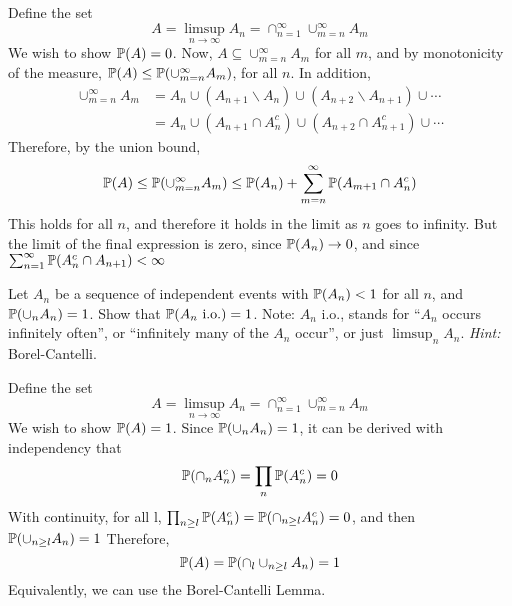 \documentclass[a4paper, 12pt, answers]{exam}
\newcommand{\rai}{\rightarrow \infty}
\begin{document}
\begin{questions}
\begin{solution}
	Define the set
	\begin{equation*}
	A=\limsup_{n\rai}A_n=\cap_{n=1}^{\infty}\cup_{m=n}^{\infty}A_m
	\end{equation*}
	We wish to show $\operatorname{\mathbb{P}}(A)=0$. Now, $A\subseteq \cup_{m=n}^{\infty}A_m$ for all $m$, and by monotonicity of the measure, $\operatorname{\mathbb{P}}(A)\le\operatorname{\mathbb{P}}(\cup_{m=n}^{\infty} A_m)$, for all $n$. In addition,
	\begin{equation*}
	\begin{aligned}
	\cup_{m=n}^{\infty}A_m&=A_n\cup(A_{n+1}\backslash A_n)\cup(A_{n+2}\backslash A_{n+1})\cup\cdots\\
	&=A_n\cup(A_{n+1}\cap A_n^c)\cup(A_{n+2}\cap A_{n+1}^c)\cup\cdots
	\end{aligned}
	\end{equation*}
	Therefore, by the union bound,
	\begin{equation*}
	\operatorname{\mathbb{P}}(A)\le\operatorname{\mathbb{P}}(\cup_{m=n}^{\infty}A_m)\le\operatorname{\mathbb{P}}(A_n)+\sum_{m=n}^{\infty}\operatorname{\mathbb{P}}(A_{m+1}\cap A_n^c)
	\end{equation*}
	This holds for all $n$, and therefore it holds in the limit as $n$ goes to infinity. But the limit of the final expression is zero, since $\operatorname{\mathbb{P}}(A_n)\rightarrow 0$, and since $\sum_{n=1}^{\infty}\operatorname{\mathbb{P}}(A_n^c\cap A_{n+1})<\infty$
\end{solution}
\question Let $A_n$ be a sequence of independent events with $\operatorname{\mathbb{P}}(A_n) < 1$ for all $n$, and $\operatorname{\mathbb{P}}(\cup_n A_n)=1$. Show that $\operatorname{\mathbb{P}}(A_n \ \mathrm{i.o.})=1$. Note: $A_n$ i.o., stands for “$A_n$ occurs infinitely often”, or “infinitely many of the $A_n$ occur”, or just $\limsup_n A_n$. \emph{Hint:} Borel-Cantelli.
\begin{solution}
	Define the set
	\begin{equation*}
	A=\limsup_{n\rai}A_n=\cap_{n=1}^{\infty}\cup_{m=n}^{\infty}A_m
	\end{equation*}
	We wish to show $\operatorname{\mathbb{P}}(A)=1$. Since $\operatorname{\mathbb{P}}(\cup_n A_n)=1$, it can be derived with independency that
	\begin{equation*}
	\operatorname{\mathbb{P}}(\cap_nA_n^c)=\prod_{n}\operatorname{\mathbb{P}}(A_n^c)=0
	\end{equation*}
	With continuity, for all l, $\prod_{n\ge l}\operatorname{\mathbb{P}}(A_n^c)=\operatorname{\mathbb{P}}(\cap_{n\ge l}A_n^c)=0$, and then $\operatorname{\mathbb{P}}(\cup_{n\ge l}A_n)=1$
	Therefore, 
	\begin{equation*}
	\operatorname{\mathbb{P}}(A)=\operatorname{\mathbb{P}}(\cap_l\cup_{n\ge l}A_n)=1
	\end{equation*}
	Equivalently, we can use the Borel-Cantelli Lemma.
\end{solution}


\end{questions}
\end{document}
